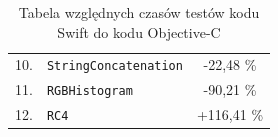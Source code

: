 \documentclass[mgr, shortabstract]{iithesis}
\begin{document}
\begin{table}[!ht]
\begin{tabularx}{1.0\textwidth}{ rXc }
        10. & \texttt{StringConcatenation}                    & \textcolor{MTGreen}{-22,48 \%}    \\ 
        11. & \texttt{RGBHistogram}                           & \textcolor{MTGreen}{-90,21 \%}    \\ 
        12. & \texttt{RC4}                                    & \textcolor{MTRed}{+116,41 \%}     \\ 
        \hline
    \end{tabularx}
    \caption{Tabela względnych czasów testów kodu Swift do kodu Objective-C}
    \label{t:results}
\end{table}

\end{document}
